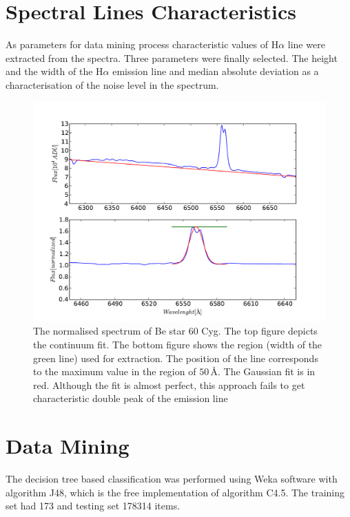 \documentclass[11pt,twoside]{article}
\begin{document}
%

\section{Spectral Lines Characteristics}
As parameters for data mining process characteristic values of
H$\alpha$ line were extracted from the spectra. Three parameters were
finally selected. The height and the width of the H$\alpha$ emission
line and median absolute deviation as a characterisation of the noise
level in the spectrum.


\begin{center}
\begin{figure}[!htbp]
  \begin{center}
    \leavevmode
    \includegraphics[scale = .6]{figSpecCharCyg60}
    \caption{The normalised spectrum of Be star 60 Cyg. The top figure
      depicts the continuum fit. The bottom figure shows the region
      (width of the green line) used for extraction. The position of
      the line corresponds to the maximum value in the region of
      $50\,\textrm{\AA}$. The Gaussian fit is in red. Although the fit
      is almost perfect, this approach fails to get characteristic
      double peak of the emission line}
    \label{FigConvolution}
  \end{center}
\end{figure}

\end{center}



\section{Data Mining}
The decision tree based classification was performed using Weka software with algorithm
J48, which is the free implementation of algorithm C4.5. The training set had
173 and testing set 178314 items.
\end{document}

